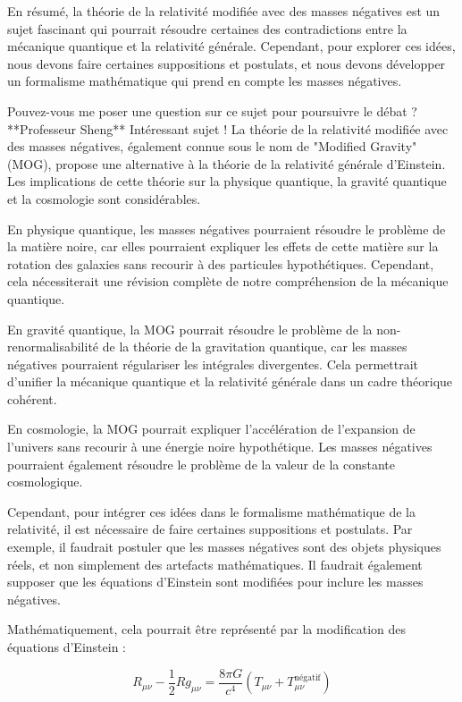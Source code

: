 En résumé, la théorie de la relativité modifiée avec des masses négatives est un sujet fascinant qui pourrait résoudre certaines des contradictions entre la mécanique quantique et la relativité générale. Cependant, pour explorer ces idées, nous devons faire certaines suppositions et postulats, et nous devons développer un formalisme mathématique qui prend en compte les masses négatives.

Pouvez-vous me poser une question sur ce sujet pour poursuivre le débat ?**Professeur Sheng**
Intéressant sujet ! La théorie de la relativité modifiée avec des masses négatives, également connue sous le nom de "Modified Gravity" (MOG), propose une alternative à la théorie de la relativité générale d'Einstein. Les implications de cette théorie sur la physique quantique, la gravité quantique et la cosmologie sont considérables.

En physique quantique, les masses négatives pourraient résoudre le problème de la matière noire, car elles pourraient expliquer les effets de cette matière sur la rotation des galaxies sans recourir à des particules hypothétiques. Cependant, cela nécessiterait une révision complète de notre compréhension de la mécanique quantique.

En gravité quantique, la MOG pourrait résoudre le problème de la non-renormalisabilité de la théorie de la gravitation quantique, car les masses négatives pourraient régulariser les intégrales divergentes. Cela permettrait d'unifier la mécanique quantique et la relativité générale dans un cadre théorique cohérent.

En cosmologie, la MOG pourrait expliquer l'accélération de l'expansion de l'univers sans recourir à une énergie noire hypothétique. Les masses négatives pourraient également résoudre le problème de la valeur de la constante cosmologique.

Cependant, pour intégrer ces idées dans le formalisme mathématique de la relativité, il est nécessaire de faire certaines suppositions et postulats. Par exemple, il faudrait postuler que les masses négatives sont des objets physiques réels, et non simplement des artefacts mathématiques. Il faudrait également supposer que les équations d'Einstein sont modifiées pour inclure les masses négatives.

Mathématiquement, cela pourrait être représenté par la modification des équations d'Einstein :

$$R_{\mu\nu} - \frac{1}{2}Rg_{\mu\nu} = \frac{8\pi G}{c^4} \left(T_{\mu\nu} + T_{\mu\nu}^{\text{négatif}}\right)$$

